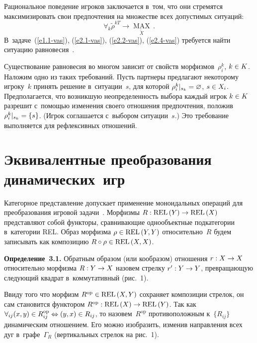 \begin{multicols}{2}
    
    Рациональное поведение игроков заключается в~том, что они стремятся 
максимизировать свои 
 предпочтения на множестве всех допустимых ситуаций:
    \begin{equation}
    \forall_k \tilde{\rho}^{kT} \to \mathop{\mathrm{MAX}}\limits_{\tilde{X}}\,.
    \label{e2.4-vas}
    \end{equation}
В~задаче~(\ref{e1.1-vas}), (\ref{e2.1-vas}), (\ref{e2.2-vas}), (\ref{e2.4-vas}) требуется 
найти ситуацию равновесия~\cite{1-vas, 5-vas}. 
    
    Существование равновесия во многом зависит от свойств 
морфизмов~$\rho_i^k$, $k\hm\in K$. Наложим одно из таких требований. Пусть 
партнеры предлагают некоторому игроку~$k$ принять решение в~ситуации~$s$, для 
которой $\rho_i^k\vert_{s_k} \hm= \varnothing$, $s\hm\in X_i$. Предполагается, что 
возникшую неопределенность выбора каж\-дый игрок $k\hm \in K$ разрешит  
с~по\-мощью изменения своего отношения предпочтения, положив 
$\rho_i^k\vert_{s_k} \hm= \{ s\}$. (Игрок соглашается с~выбором ситуации~$s$.) Это 
требование выполняется для рефлексивных отношений.
    
\section{Эквивалентные преобразования динамических~игр}

    Категорное представление допускает применение моноидальных операций для 
преобразования игровой задачи~\cite{11-vas}. Морфизмы $R: \mathrm{REL}\left(Y\right)\hm\to 
\mathrm{REL}\,(X)$ представляют собой функторы, срав\-ни\-ва\-ющие однообъектные 
подкатегории в~категории REL. Образ морфизма $\rho\hm\in \mathrm{REL}\,(Y,Y)$ 
относительно~$R$ будем записывать как композицию $R\circ \rho \hm\in \mathrm{REL}\,(X,X)$.
    
    \smallskip
    
    \noindent
    \textbf{Определение~3.1.} Обратным образом (или кообразом) отношения $r: 
X\hm\to X$ относительно морфизма $R: Y\hm\to X$ назовем стрелку $r^\prime: 
Y\hm\to Y$, превращающую сле\-ду\-ющий квад\-рат в~коммутативный  
(рис.~1).
    
    
     
     
    Ввиду того что морфизм $R^{\mathrm{op}} \hm\in \mathrm{REL}\,(X,Y)$ сохраняет композиции 
стрелок, он сам становится функтором $R^{\mathrm{op}}: \mathrm{REL}\,(X)\hm\to \mathrm{REL}\,(Y)$. Так как 
$\forall_{ij} (x,y) \hm\in R_{ij}^{\mathrm{op}} \hm\Leftrightarrow  (y,x)\hm\in R_{ij}$, то 
назовем~$R^{\mathrm{op}}$ противоположным к~$\{ R_{ij}\}$ динамическим отношением. 
Его можно изобразить, изменив на\-прав\-ле\-ния всех дуг в~графе~$\Gamma_R$ 
(вертикальных стрелок на рис.~1). 





\end{multicols}
